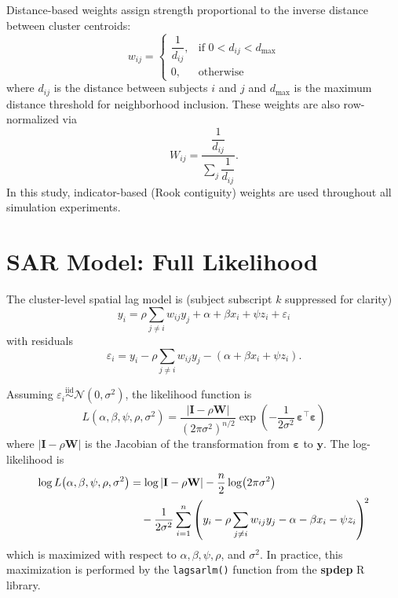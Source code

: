 \documentclass{article}[11pt]
\begin{document}
Distance-based weights assign strength proportional to the inverse distance between cluster centroids:
\begin{equation}
    w_{ij} =
    \begin{cases}
        \dfrac{1}{d_{ij}}, & \text{if } 0 < d_{ij} < d_{\max}\\[4pt]
        0, & \text{otherwise}
    \end{cases}
\end{equation}
where $d_{ij}$ is the distance between subjects $i$ and $j$ and $d_{\max}$ is the maximum distance threshold for neighborhood inclusion. These weights are also row-normalized via
\begin{equation}
    W_{ij} = \frac{\dfrac{1}{d_{ij}}}{\displaystyle\sum_{j}\dfrac{1}{d_{ij}}}.
\end{equation}
In this study, indicator-based (Rook contiguity) weights are used throughout all simulation experiments.

\section{SAR Model: Full Likelihood}\label{appendix:SARLikelihood}

The cluster-level spatial lag model is (subject subscript $k$ suppressed for clarity)
\begin{equation}
    y_i = \rho \sum_{j \neq i} w_{ij} y_j + \alpha + \beta x_i + \psi z_i + \varepsilon_i
\end{equation}
with residuals
\begin{equation}
    \varepsilon_i = y_i - \rho \sum_{j \neq i} w_{ij} y_j - \left(\alpha + \beta x_i + \psi z_i\right).
\end{equation}

Assuming $\varepsilon_i \overset{\text{iid}}{\sim} \mathcal{N}(0,\sigma^2)$, the likelihood function is
\begin{equation}
    L\!\left(\alpha,\beta,\psi,\rho,\sigma^2\right)
    = \frac{|\mathbf{I} - \rho\mathbf{W}|}{\left(2\pi\sigma^2\right)^{n/2}}
      \exp\!\left(-\frac{1}{2\sigma^2}\,\boldsymbol{\varepsilon}^{\top}\boldsymbol{\varepsilon}\right)
\end{equation}
where $|\mathbf{I}-\rho\mathbf{W}|$ is the Jacobian of the transformation from $\boldsymbol{\varepsilon}$ to $\mathbf{y}$. The log-likelihood is
\begin{align}
    \log L\!\left(\alpha,\beta,\psi,\rho,\sigma^2\right)
    &= \log|\mathbf{I} - \rho\mathbf{W}|
       - \frac{n}{2}\log\!\left(2\pi\sigma^2\right) \notag \\
    &\quad - \frac{1}{2\sigma^2}
        \sum_{i=1}^{n}
        \left(y_i - \rho\sum_{j \neq i}w_{ij}y_j - \alpha - \beta x_i - \psi z_i\right)^{\!2}
\end{align}
which is maximized with respect to $\alpha, \beta, \psi, \rho$, and $\sigma^2$. In practice, this maximization is performed by the \texttt{lagsarlm()} function from the \textbf{spdep} R library\cite{bivand_r_2022}.
\end{document}
